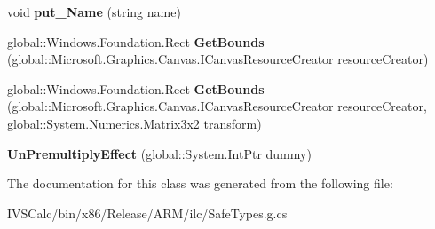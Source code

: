 \begin{DoxyCompactItemize}
\mbox{\label{class_microsoft_1_1_graphics_1_1_canvas_1_1_effects_1_1_un_premultiply_effect_acd1571fa9f397e1baa0a8c32080b1c2d}} 
void {\bfseries put\+\_\+\+Name} (string name)
\item 
\mbox{\label{class_microsoft_1_1_graphics_1_1_canvas_1_1_effects_1_1_un_premultiply_effect_a5100abdc8715c4ba995f6f6a6e0cb593}} 
global\+::\+Windows.\+Foundation.\+Rect {\bfseries Get\+Bounds} (global\+::\+Microsoft.\+Graphics.\+Canvas.\+I\+Canvas\+Resource\+Creator resource\+Creator)
\item 
\mbox{\label{class_microsoft_1_1_graphics_1_1_canvas_1_1_effects_1_1_un_premultiply_effect_a88c2619b79305957a357452b58d66be6}} 
global\+::\+Windows.\+Foundation.\+Rect {\bfseries Get\+Bounds} (global\+::\+Microsoft.\+Graphics.\+Canvas.\+I\+Canvas\+Resource\+Creator resource\+Creator, global\+::\+System.\+Numerics.\+Matrix3x2 transform)
\item 
\mbox{\label{class_microsoft_1_1_graphics_1_1_canvas_1_1_effects_1_1_un_premultiply_effect_afec8af676d2e6c2a8e095f427e8782f9}} 
{\bfseries Un\+Premultiply\+Effect} (global\+::\+System.\+Int\+Ptr dummy)
\end{DoxyCompactItemize}


The documentation for this class was generated from the following file\+:\begin{DoxyCompactItemize}
\item 
I\+V\+S\+Calc/bin/x86/\+Release/\+A\+R\+M/ilc/Safe\+Types.\+g.\+cs\end{DoxyCompactItemize}

